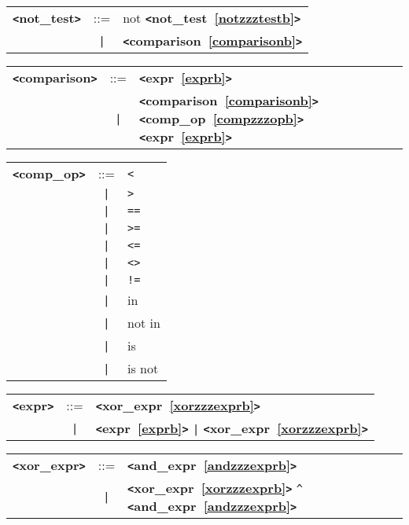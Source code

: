 \documentclass[12pt]{article}
\begin{document}
\label{notzzztestb}
\begin{tabular}{lcl}
{\bf \verb+<+not\_test\verb+>+} & ::=  & not {\bf \verb+<+not\_test~\ref{notzzztestb}\verb+>+}  \\
 & \verb+|+  & {\bf \verb+<+comparison~\ref{comparisonb}\verb+>+}  \\
\end{tabular}

\label{comparisonb}
\begin{tabular}{lcl}
{\bf \verb+<+comparison\verb+>+} & ::=  & {\bf \verb+<+expr~\ref{exprb}\verb+>+}  \\
 & \verb+|+  & {\bf \verb+<+comparison~\ref{comparisonb}\verb+>+}  {\bf \verb+<+comp\_op~\ref{compzzzopb}\verb+>+}  {\bf \verb+<+expr~\ref{exprb}\verb+>+}  \\
\end{tabular}

\label{compzzzopb}
\begin{tabular}{lcl}
{\bf \verb+<+comp\_op\verb+>+} & ::=  & \verb|<| \\
 & \verb+|+  & \verb|>| \\
 & \verb+|+  & \verb|==| \\
 & \verb+|+  & \verb|>=| \\
 & \verb+|+  & \verb|<=| \\
 & \verb+|+  & \verb|<>| \\
 & \verb+|+  & \verb|!=| \\
 & \verb+|+  & in \\
 & \verb+|+  & not in \\
 & \verb+|+  & is \\
 & \verb+|+  & is not \\
\end{tabular}

\label{exprb}
\begin{tabular}{lcl}
{\bf \verb+<+expr\verb+>+} & ::=  & {\bf \verb+<+xor\_expr~\ref{xorzzzexprb}\verb+>+}  \\
 & \verb+|+  & {\bf \verb+<+expr~\ref{exprb}\verb+>+}  \verb+|+ {\bf \verb+<+xor\_expr~\ref{xorzzzexprb}\verb+>+}  \\
\end{tabular}

\label{xorzzzexprb}
\begin{tabular}{lcl}
{\bf \verb+<+xor\_expr\verb+>+} & ::=  & {\bf \verb+<+and\_expr~\ref{andzzzexprb}\verb+>+}  \\
 & \verb+|+  & {\bf \verb+<+xor\_expr~\ref{xorzzzexprb}\verb+>+}  \verb|^| {\bf \verb+<+and\_expr~\ref{andzzzexprb}\verb+>+}  \\
\end{tabular}
\end{document}
